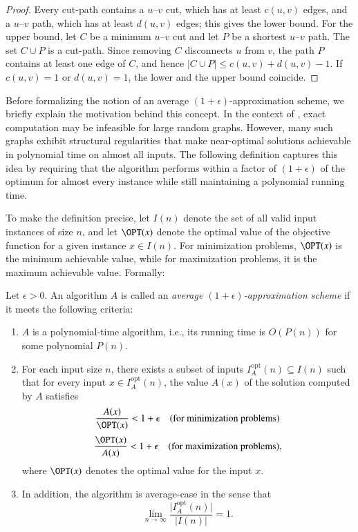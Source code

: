 \begin{proof}
Every cut-path contains a $u$--$v$ cut, which has at least $c(u, v)$ edges, and a $u$--$v$ path, which has at least $d(u, v)$ edges; this gives the lower bound.
For the upper bound, let $C$ be a minimum $u$--$v$ cut and let $P$ be a shortest $u$--$v$ path.
The set $C \cup P$ is a cut-path.
Since removing $C$ disconnects $u$ from $v$, the path $P$ contains at least one edge of $C$, and hence $|C \cup P| \leq c(u, v) + d(u, v) - 1$.
If $c(u, v) = 1$ or $d(u, v) = 1$, the lower and the upper bound coincide.
\end{proof}


Before formalizing the notion of an average $(1+\epsilon)$-approximation scheme, we briefly explain the motivation behind this concept.
In the context of \MinCutPath, exact computation may be infeasible for large random graphs.
However, many such graphs exhibit structural regularities that make near-optimal solutions achievable in polynomial time on almost all inputs.
The following definition captures this idea by requiring that the algorithm performs within a factor of $(1+\epsilon)$ of the optimum for almost every instance while still maintaining a polynomial running time.

To make the definition precise, let $I(n)$ denote the set of all valid input instances of size $n$, and let $\OPT(x)$ denote the optimal value of the objective function for a given instance $x \in I(n)$.
For minimization problems, $\OPT(x)$ is the minimum achievable value, while for maximization problems, it is the maximum achievable value.
Formally:

\begin{definition}
\label{def:approximation-scheme}
Let $\epsilon > 0$. An algorithm $A$ is called an \emph{average $(1+\epsilon)$-approximation scheme} if it meets the following criteria:
\begin{enumerate}
    \item $A$ is a polynomial-time algorithm, i.e., its running time is $O(P(n))$ for some polynomial $P(n)$.
    \item For each input size $n$, there exists a subset of inputs $I_{A}^{\mathrm{opt}}(n) \subseteq I(n)$ such that for every input $x \in I_{A}^{\mathrm{opt}}(n)$, the value $A(x)$ of the solution computed by $A$ satisfies
    \[
    \frac{A(x)}{\OPT(x)} < 1+\epsilon \quad \text{(for minimization problems)}
    \]
    \[
    \frac{\OPT(x)}{A(x)} < 1+\epsilon \quad \text{(for maximization problems)},
    \]
    where $\OPT(x)$ denotes the optimal value for the input $x$.
    \item In addition, the algorithm is average-case in the sense that
    \[
    \lim_{n \to \infty} \frac{\lvert I_{A}^{\mathrm{opt}}(n) \rvert}{\lvert I(n) \rvert} = 1.
    \]
\end{enumerate}
\end{definition}

